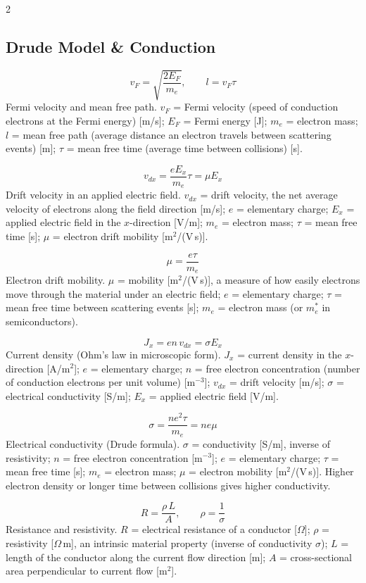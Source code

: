 \documentclass[9pt]{extarticle}
\newcommand{\desc}[1]{{\small\color{desc}#1}}
\begin{document}
\begin{multicols}{2}
\subsection{Drude Model \& Conduction}
\[v_F = \sqrt{\frac{2E_F}{m_e}},\qquad l = v_F\tau\]
\desc{Fermi velocity and mean free path. $v_F$ = Fermi velocity (speed of conduction electrons at the Fermi energy) [m/s]; $E_F$ = Fermi energy [J]; $m_e$ = electron mass; $l$ = mean free path (average distance an electron travels between scattering events) [m]; $\tau$ = mean free time (average time between collisions) [s].}

\[v_{dx} = \frac{eE_x}{m_e}\tau = \mu E_x\]
\desc{Drift velocity in an applied electric field. $v_{dx}$ = drift velocity, the net average velocity of electrons along the field direction [m/s]; $e$ = elementary charge; $E_x$ = applied electric field in the $x$-direction [V/m]; $m_e$ = electron mass; $\tau$ = mean free time [s]; $\mu$ = electron drift mobility [m$^2$/(V\,s)].}

\[\mu = \frac{e\tau}{m_e}\]
\desc{Electron drift mobility. $\mu$ = mobility [m$^2$/(V\,s)], a measure of how easily electrons move through the material under an electric field; $e$ = elementary charge; $\tau$ = mean free time between scattering events [s]; $m_e$ = electron mass (or $m_e^*$ in semiconductors).}

\[J_x = en\,v_{dx} = \sigma E_x\]
\desc{Current density (Ohm's law in microscopic form). $J_x$ = current density in the $x$-direction [A/m$^2$]; $e$ = elementary charge; $n$ = free electron concentration (number of conduction electrons per unit volume) [m$^{-3}$]; $v_{dx}$ = drift velocity [m/s]; $\sigma$ = electrical conductivity [S/m]; $E_x$ = applied electric field [V/m].}

\[\sigma = \frac{ne^2\tau}{m_e} = ne\mu\]
\desc{Electrical conductivity (Drude formula). $\sigma$ = conductivity [S/m], inverse of resistivity; $n$ = free electron concentration [m$^{-3}$]; $e$ = elementary charge; $\tau$ = mean free time [s]; $m_e$ = electron mass; $\mu$ = electron mobility [m$^2$/(V\,s)]. Higher electron density or longer time between collisions gives higher conductivity.}

\[R = \frac{\rho\,L}{A},\qquad \rho = \frac{1}{\sigma}\]
\desc{Resistance and resistivity. $R$ = electrical resistance of a conductor [$\Omega$]; $\rho$ = resistivity [$\Omega$\,m], an intrinsic material property (inverse of conductivity $\sigma$); $L$ = length of the conductor along the current flow direction [m]; $A$ = cross-sectional area perpendicular to current flow [m$^2$].}


\end{multicols}
\end{document}
